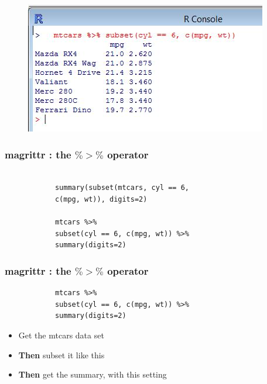 \documentclass{beamer}
\begin{document}
	\begin{frame}
		\begin{figure}
			\centering
			\includegraphics[width=0.99\linewidth]{images/magrittrcode01}
			
		\end{figure}
		
	\end{frame}
	\begin{frame}[fragile]
		\frametitle{magrittr :  the $\%>\%$ operator}
		\Large
		\begin{framed}
			\begin{verbatim}
			
			summary(subset(mtcars, cyl == 6, 
			c(mpg, wt)), digits=2)
			
			mtcars %>% 
			subset(cyl == 6, c(mpg, wt)) %>% 
			summary(digits=2)
			\end{verbatim}
		\end{framed}
		
	\end{frame}
	\begin{frame}[fragile]
		\frametitle{magrittr :  the $\%>\%$ operator}
		\Large
		\begin{framed}
			\begin{verbatim}	
			mtcars %>% 
			subset(cyl == 6, c(mpg, wt)) %>% 
			summary(digits=2)
			\end{verbatim}
		\end{framed}
		\begin{itemize}
			\item Get the mtcars data set
			\item \textbf{Then} subset it like this
			\item \textbf{Then} get the summary, with this setting
		\end{itemize}
	\end{frame}
	
\end{document}
